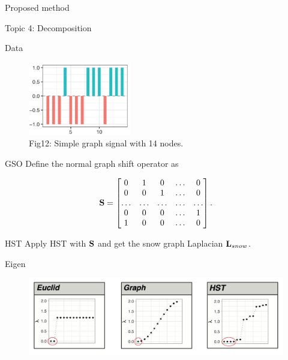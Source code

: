 \documentclass[
  ignorenonframetext,
]{beamer}
\begin{document}
\begin{frame}{Proposed method}
\label{proposed-method-5}
\begin{block}{Topic 4: Decomposition}
\label{topic-4-decomposition}
\end{block}

\begin{block}{Data}
\begin{figure}[H]

{\centering \includegraphics[width=0.4\textwidth,height=\textheight]{Beamer_files/figure-beamer/1330f074-21c6-48a3-b7bb-56b2c6aa30df-1-0a985073-2a42-4c15-b4ee-e1f0b426939b.png}

}

\caption{Fig12: Simple graph signal with 14 nodes.}

\end{figure}%
\end{block}

\begin{block}{GSO}
Define the normal graph shift operator as

\[{\bf S} = 
\begin{bmatrix} 
0 &1 &0 &\dots & 0 \\ 
0 &0 &1 &\dots & 0 \\ 
\dots & \dots & \dots &\dots & \dots \\ 
0 &0 &0 &\dots & 1 \\ 
1 &0 &0 &\dots & 0
\end{bmatrix}.\]
\end{block}

\begin{block}{HST}
Apply HST with \({\bf S}\) and get the snow graph Laplacian
\({\bf L}_{snow}\).
\end{block}

\begin{block}{Eigen}
\begin{figure}[H]

{\centering \includegraphics{Beamer_files/figure-beamer/1330f074-21c6-48a3-b7bb-56b2c6aa30df-3-709737c2-a885-44b6-97ad-74872801614e.png}

}
\end{figure}
\end{block}
\end{frame}
\end{document}
